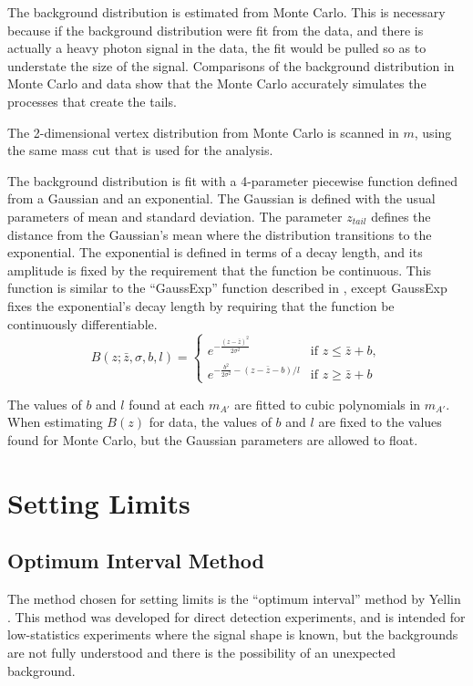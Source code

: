 The background distribution is estimated from Monte Carlo.
This is necessary because if the background distribution were fit from the data, and there is actually a heavy photon signal in the data, the fit would be pulled so as to understate the size of the signal.
Comparisons of the background distribution in Monte Carlo and data show that the Monte Carlo accurately simulates the processes that create the tails.

The 2-dimensional vertex distribution from Monte Carlo is scanned in $m$, using the same mass cut that is used for the analysis.

The background distribution is fit with a 4-parameter piecewise function defined from a Gaussian and an exponential.
The Gaussian is defined with the usual parameters of mean and standard deviation.
The parameter $z_{tail}$ defines the distance from the Gaussian's mean where the distribution transitions to the exponential.
The exponential is defined in terms of a decay length, and its amplitude is fixed by the requirement that the function be continuous.
This function is similar to the ``GaussExp'' function described in \cite{search_cms_2015}, except GaussExp fixes the exponential's decay length by requiring that the function be continuously differentiable.
\begin{equation}
B(z;\bar{z},\sigma,b,l)=
\begin{cases}
e^{-\frac{(z-\bar{z})^2}{2\sigma^2}} &\text{if } z\le\bar{z}+b,\\
e^{-\frac{b^2}{2\sigma^2} - (z-\bar{z}-b)/l}  &\text{if } z\ge\bar{z}+b
\end{cases}
\end{equation}

The values of $b$ and $l$ found at each $m_{A'}$ are fitted to cubic polynomials in $m_{A'}$.
When estimating $B(z)$ for data, the values of $b$ and $l$ are fixed to the values found for Monte Carlo, but the Gaussian parameters are allowed to float.

\section{Setting Limits}


\subsection{Optimum Interval Method}
The method chosen for setting limits is the ``optimum interval'' method by Yellin \cite{yellin_finding_2002}.
This method was developed for direct detection experiments, and is intended for low-statistics experiments where the signal shape is known, but the backgrounds are not fully understood and there is the possibility of an unexpected background.

